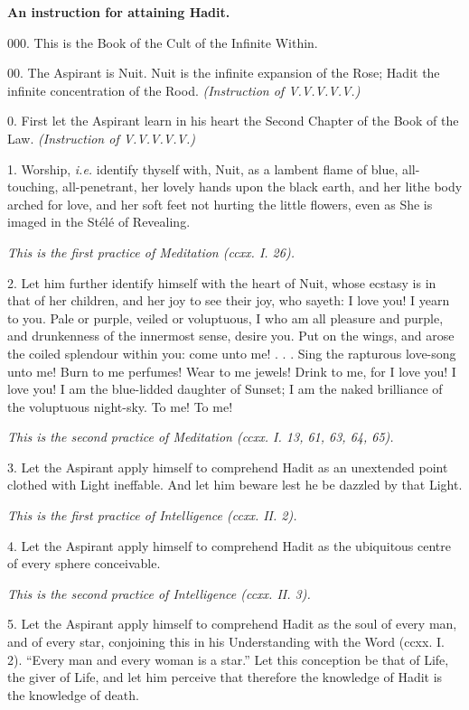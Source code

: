 

\textbf{An instruction for attaining Hadit.}

000. This is the Book of the Cult of the Infinite Within.

00. The Aspirant is Nuit. Nuit is the infinite expansion of the Rose; Hadit the infinite concentration of the Rood. \textit{(Instruction of V.V.V.V.V.)}

0. First let the Aspirant learn in his heart the Second Chapter of the Book of the Law. \textit{(Instruction of V.V.V.V.V.)}

1. Worship, \textit{i.e.} identify thyself with, Nuit, as a lambent flame of blue, all-touching, all-penetrant, her lovely hands upon the black earth, and her lithe body arched for love, and her soft feet not hurting the little flowers, even as She is imaged in the St\'{e}l\'{e} of Revealing.

\textit{This is the first practice of Meditation (ccxx. I. 26).}

2. Let him further identify himself with the heart of Nuit, whose ecstasy is in that of her children, and her joy to see their joy, who sayeth: I love you! I yearn to you. Pale or purple, veiled or voluptuous, I who am all pleasure and purple, and drunkenness of the innermost sense, desire you. Put on the wings, and arose the coiled splendour within you: come unto me! . . . Sing the rapturous love-song unto me! Burn to me perfumes! Wear to me jewels! Drink to me, for I love you! I love you! I am the blue-lidded daughter of Sunset; I am the naked brilliance of the voluptuous night-sky. To me! To me!

\textit{This is the second practice of Meditation (ccxx. I. 13, 61, 63, 64, 65).}

3. Let the Aspirant apply himself to comprehend Hadit as an unextended point clothed with Light ineffable. And let him beware lest he be dazzled by that Light.

\textit{This is the first practice of Intelligence (ccxx. II. 2).}

4. Let the Aspirant apply himself to comprehend Hadit as the ubiquitous centre of every sphere conceivable.

\textit{This is the second practice of Intelligence (ccxx. II. 3).}

5. Let the Aspirant apply himself to comprehend Hadit as the soul of every man, and of every star, conjoining this in his Understanding with the Word (ccxx. I. 2). \enquote{Every man and every woman is a star.} Let this conception be that of Life, the giver of Life, and let him perceive that therefore the knowledge of Hadit is the knowledge of death.

